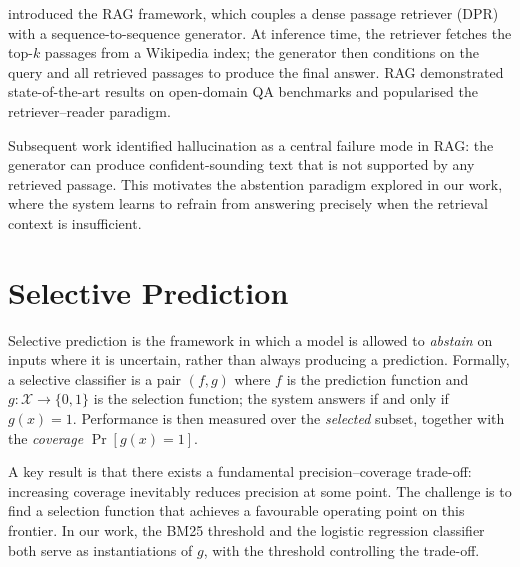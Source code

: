 \citet{lewis2020rag} introduced the RAG framework, which couples a dense
passage retriever (DPR) with a sequence-to-sequence generator. At inference
time, the retriever fetches the top-$k$ passages from a Wikipedia index; the
generator then conditions on the query and all retrieved passages to produce the
final answer. RAG demonstrated state-of-the-art results on open-domain QA
benchmarks and popularised the retriever–reader paradigm.

Subsequent work \cite{zhang2023rag} identified hallucination as a central
failure mode in RAG: the generator can produce confident-sounding text that is
not supported by any retrieved passage. This motivates the abstention paradigm
explored in our work, where the system learns to refrain from answering
precisely when the retrieval context is insufficient.

\section{Selective Prediction}
\label{sec:bg_selective}

Selective prediction \cite{geifman2017selective} is the framework in which a
model is allowed to \emph{abstain} on inputs where it is uncertain, rather than
always producing a prediction. Formally, a selective classifier is a pair
$(f, g)$ where $f$ is the prediction function and $g : \mathcal{X} \to \{0,1\}$
is the selection function; the system answers if and only if $g(x)=1$.
Performance is then measured over the \emph{selected} subset, together with the
\emph{coverage} $\Pr[g(x)=1]$.

A key result is that there exists a fundamental precision–coverage trade-off:
increasing coverage inevitably reduces precision at some point. The challenge is
to find a selection function that achieves a favourable operating point on this
frontier. In our work, the BM25 threshold and the logistic regression
classifier both serve as instantiations of $g$, with the threshold controlling
the trade-off.
